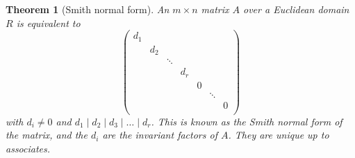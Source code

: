 \documentclass{article}
\theoremstyle{plain}\theoremheaderfont{\normalfont\itshape}\theorembodyfont{\rmfamily}\theoremseparator{.}\newtheorem*{rem}{Remark}\newtheorem*{ex}{Example}\newtheorem*{proof}{Proof}\newtheorem*{altp}{Alternative proof}\newtheorem*{nonex}{Non-Example}
\theoremstyle{plain}\theoremheaderfont{\normalfont\bfseries}\theorembodyfont{\rmfamily}\theoremseparator{.}\newtheorem{thm}{Theorem}[section]\newtheorem{lem}[thm]{Lemma}\newtheorem{prop}[thm]{Proposition}\newtheorem*{cor}{Corollary}\newtheorem{defn}[thm]{Definition}\newtheorem{clm}[thm]{Claim}\newtheorem{clminproof}{Claim}\newtheorem*{notn}{Notation}\newtheorem*{exer}{Exercise}\newtheorem*{lemnn}{Lemma}
\theoremstyle{break}\theoremheaderfont{\normalfont\itshape}\theorembodyfont{\rmfamily}\theoremseparator{.\medskip}\newtheorem*{proofskip}{Proof}\newtheorem*{exs}{Examples}\newtheorem*{rems}{Remarks}\newtheorem*{obs}{Observations}
\theoremstyle{break}\theoremheaderfont{\normalfont\bfseries}\theorembodyfont{\rmfamily}\theoremseparator{.\medskip}\newtheorem{lemskip}[thm]{Lemma}\newtheorem{defnskip}[thm]{Definition}\newtheorem{propskip}[thm]{Proposition}\newtheorem{thmskip}[thm]{Theorem}
\numberwithin{equation}{section}
\begin{document}
    \begin{thm}[Smith normal form]
        An \(m\times n\) matrix \(A\) over a Euclidean domain \(R\) is equivalent to
        \[\begin{pmatrix}
            d_1\\
            ~ & d_2\\
            ~ & ~ & \ddots\\
            ~ & ~ & ~ & d_r\\
            ~ & ~ & ~ & ~ & 0\\
            ~ & ~ & ~ & ~ & ~ & \ddots\\
            ~ & ~ & ~ & ~ & ~ & ~ & 0\\
        \end{pmatrix}\]
        with \(d_i\ne 0\) and \(d_1\mid d_2\mid d_3\mid\dots\mid d_r\). This is known as the \textit{Smith normal form} of the matrix, and the \(d_i\) are the \textit{invariant factors} of \(A\). They are unique up to associates.
    \end{thm}
\end{document}
